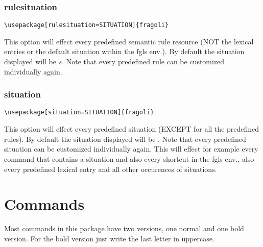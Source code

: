 \documentclass[10pt, a4paper]{article}
\begin{document}
	\subsubsection{rulesituation}
	\begin{lstlisting}[style=A]
	\usepackage[rulesituation=SITUATION]{fragoli}
	\end{lstlisting}
	This option will effect every predefined semantic rule resource (NOT the lexical entries or the default situation within the fgls env.). By default the situation displayed will be $s$. Note that every predefined rule can be customized individually again.
	\subsubsection{situation}
	\begin{lstlisting}[style=A]
	\usepackage[situation=SITUATION]{fragoli}
	\end{lstlisting}
	This option will effect every predefined situation (EXCEPT for all the predefined rules). By default the situation displayed will be \sstar. Note that every predefined situation can be customized individually again. This will effect for example every command that contains a situation and also every shortcut in the fgls env., also every predefined lexical entry and all other occurences of situations.
	\section{Commands}
	Most commands in this package have two versions, one normal and one bold version. For the bold version just write the last letter in uppercase.
\end{document}
